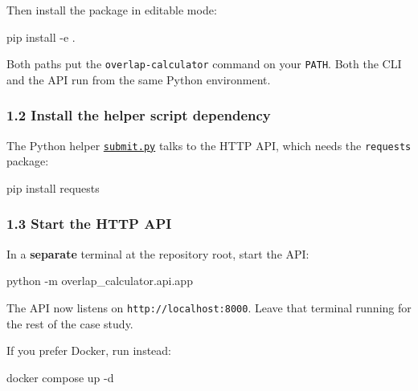 \documentclass[
  11pt,
]{article}
\newenvironment{Shaded}{}{}
\newcommand{\AttributeTok}[1]{\textcolor[rgb]{0.49,0.56,0.16}{#1}}
\newcommand{\ExtensionTok}[1]{#1}
\newcommand{\NormalTok}[1]{#1}
\begin{document}
Then install the package in editable mode:

\begin{Shaded}
\begin{Highlighting}[]
\ExtensionTok{pip}\NormalTok{ install }\AttributeTok{{-}e}\NormalTok{ .}
\end{Highlighting}
\end{Shaded}

Both paths put the \texttt{overlap-calculator} command on your
\texttt{PATH}. Both the CLI and the API run from the same Python
environment.

\hypertarget{12-install-the-helper-script-dependency}{
\subsubsection{1.2 Install the helper script
dependency}\label{12-install-the-helper-script-dependency}}

The Python helper
\href{https://github.com/pinarsyt/overlap-calculator/blob/main/case_studies/01_theoretical_only/submit.py}{\texttt{submit.py}}
talks to the HTTP API, which needs the \texttt{requests} package:

\begin{Shaded}
\begin{Highlighting}[]
\ExtensionTok{pip}\NormalTok{ install requests}
\end{Highlighting}
\end{Shaded}

\hypertarget{13-start-the-http-api}{
\subsubsection{1.3 Start the HTTP API}\label{13-start-the-http-api}}

In a \textbf{separate} terminal at the repository root, start the API:

\begin{Shaded}
\begin{Highlighting}[]
\ExtensionTok{python} \AttributeTok{{-}m}\NormalTok{ overlap\_calculator.api.app}
\end{Highlighting}
\end{Shaded}

The API now listens on \texttt{http://localhost:8000}. Leave that
terminal running for the rest of the case study.

If you prefer Docker, run instead:

\begin{Shaded}
\begin{Highlighting}[]
\ExtensionTok{docker}\NormalTok{ compose up }\AttributeTok{{-}d}
\end{Highlighting}
\end{Shaded}
\end{document}
